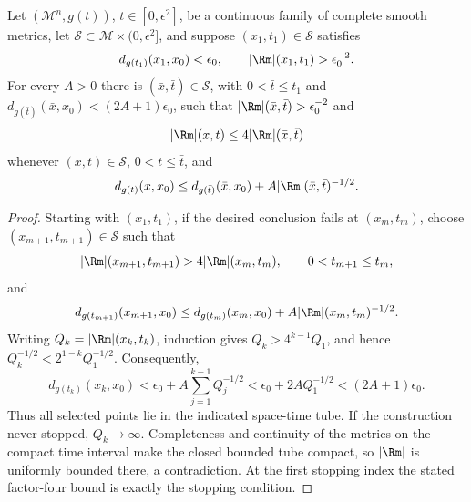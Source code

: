 \begin{proposition}
\label{prop:chow-iii-appj-solution-22-5}
Let \((\mathcal M^n,g(t))\), \(t\in[0,\epsilon^2]\), be a continuous family
of complete smooth metrics, let \(\mathcal S\subset\mathcal M\times
(0,\epsilon^2]\), and suppose \((x_1,t_1)\in\mathcal S\) satisfies
\[
 d_{g(t_1)}(x_1,x_0)<\epsilon_0,
 \qquad |\Rm|(x_1,t_1)>\epsilon_0^{-2}.
\]
For every \(A>0\) there is \((\bar x,\bar t)\in\mathcal S\), with
\(0<\bar t\leq t_1\) and
\(d_{g(\bar t)}(\bar x,x_0)<(2A+1)\epsilon_0\), such that
\(|\Rm|(\bar x,\bar t)>\epsilon_0^{-2}\) and
\[
 |\Rm|(x,t)\leq4|\Rm|(\bar x,\bar t)
\]
whenever \((x,t)\in\mathcal S\), \(0<t\leq\bar t\), and
\[
 d_{g(t)}(x,x_0)\leq d_{g(\bar t)}(\bar x,x_0)
     +A|\Rm|(\bar x,\bar t)^{-1/2}.
\]
\end{proposition}
\begin{proof}
\sketch
Starting with \((x_1,t_1)\), if the desired conclusion fails at
\((x_m,t_m)\), choose \((x_{m+1},t_{m+1})\in\mathcal S\) such that
\[
 |\Rm|(x_{m+1},t_{m+1})>4|\Rm|(x_m,t_m),
 \qquad 0<t_{m+1}\leq t_m,
\]
and
\[
 d_{g(t_{m+1})}(x_{m+1},x_0)
 \leq d_{g(t_m)}(x_m,x_0)+A|\Rm|(x_m,t_m)^{-1/2}.
\]
Writing \(Q_k=|\Rm|(x_k,t_k)\), induction gives
\(Q_k>4^{k-1}Q_1\), and hence
\(Q_k^{-1/2}<2^{1-k}Q_1^{-1/2}\).  Consequently,
\[
 d_{g(t_k)}(x_k,x_0)
 <\epsilon_0+A\sum_{j=1}^{k-1}Q_j^{-1/2}
 <\epsilon_0+2AQ_1^{-1/2}
 <(2A+1)\epsilon_0.
\]
Thus all selected points lie in the indicated space-time tube.  If the
construction never stopped, \(Q_k\to\infty\).  Completeness and continuity
of the metrics on the compact time interval make the closed bounded tube
compact, so \(|\Rm|\) is uniformly bounded there, a contradiction.  At the
first stopping index the stated factor-four bound is exactly the stopping
condition.
\end{proof}

